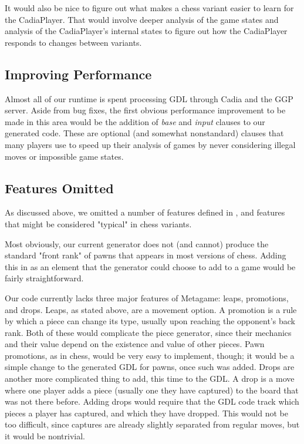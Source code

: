\documentclass[11pt,letterpaper]{article}
\begin{document}
It would also be nice to figure out what makes a chess variant easier to learn for the CadiaPlayer. That would involve deeper analysis of the game states and analysis of the CadiaPlayer's internal states to figure out how the CadiaPlayer responds to changes between variants.


\subsection{Improving Performance}

Almost all of our runtime is spent processing GDL through Cadia and the GGP
server. Aside from bug fixes, the first obvious performance improvement to be
made in this area would be the addition of \textit{base} and \textit{input}
clauses to our generated code. These are optional (and somewhat nonstandard)
clauses that many players use to speed up their analysis of games by never
considering illegal moves or impossible game states.

\subsection{Features Omitted}

As discussed above, we omitted a number of features defined in \cite{metagame},
and features that might be considered "typical" in chess variants.

Most obviously, our current generator does not (and cannot) produce the standard
"front rank" of pawns that appears in most versions of chess. Adding this in as
an element that the generator could choose to add to a game would be fairly
straightforward.

Our code currently lacks three major features of Metagame: leaps, promotions,
and drops. Leaps, as stated above, are a movement option. A promotion is a rule
by which a piece can change its type, usually upon reaching the opponent's back
rank. Both of these would complicate the piece generator, since their mechanics
and their value depend on the existence and value of other pieces. Pawn
promotions, as in chess, would be very easy to implement, though; it would be a
simple change to the generated GDL for pawns, once such was added. Drops are
another more complicated thing to add, this time to the GDL. A drop is a move
where one player adds a piece (usually one they have captured) to the board that
was not there before. Adding drops would require that the GDL code track which
pieces a player has captured, and which they have dropped. This would not be too
difficult, since captures are already slightly separated from regular moves, but
it would be nontrivial.
\end{document}
